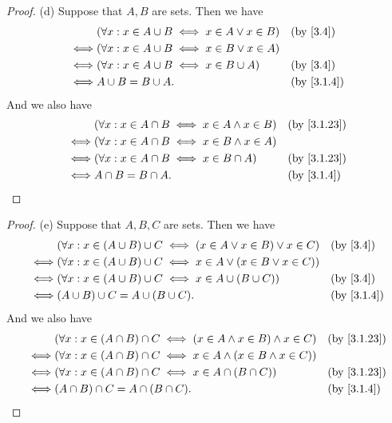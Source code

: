 \begin{proof}{(d)}
	Suppose that \(A, B\) are sets.
	Then we have
	\begin{align*}
		     & (\forall x : x \in A \cup B \iff x \in A \lor x \in B) &  & \by{3.4}   \\
		\iff & (\forall x : x \in A \cup B \iff x \in B \lor x \in A)                 \\
		\iff & (\forall x : x \in A \cup B \iff x \in B \cup A)       &  & \by{3.4}   \\
		\iff & A \cup B = B \cup A.                                   &  & \by{3.1.4}
	\end{align*}
	And we also have
	\begin{align*}
		     & (\forall x : x \in A \cap B \iff x \in A \land x \in B) &  & \by{3.1.23} \\
		\iff & (\forall x : x \in A \cap B \iff x \in B \land x \in A)                  \\
		\iff & (\forall x : x \in A \cap B \iff x \in B \cap A)        &  & \by{3.1.23} \\
		\iff & A \cap B = B \cap A.                                    &  & \by{3.1.4}
	\end{align*}
\end{proof}

\begin{proof}{(e)}
	Suppose that \(A, B, C\) are sets.
	Then we have
	\begin{align*}
		     & (\forall x : x \in (A \cup B) \cup C \iff (x \in A \lor x \in B) \lor x \in C) &  & \by{3.4}   \\
		\iff & (\forall x : x \in (A \cup B) \cup C \iff x \in A \lor (x \in B \lor x \in C))                 \\
		\iff & (\forall x : x \in (A \cup B) \cup C \iff x \in A \cup (B \cup C))             &  & \by{3.4}   \\
		\iff & (A \cup B) \cup C = A \cup (B \cup C).                                         &  & \by{3.1.4}
	\end{align*}
	And we also have
	\begin{align*}
		     & (\forall x : x \in (A \cap B) \cap C \iff (x \in A \land x \in B) \land x \in C) &  & \by{3.1.23} \\
		\iff & (\forall x : x \in (A \cap B) \cap C \iff x \in A \land (x \in B \land x \in C))                  \\
		\iff & (\forall x : x \in (A \cap B) \cap C \iff x \in A \cap (B \cap C))               &  & \by{3.1.23} \\
		\iff & (A \cap B) \cap C = A \cap (B \cap C).                                           &  & \by{3.1.4}
	\end{align*}
\end{proof}

